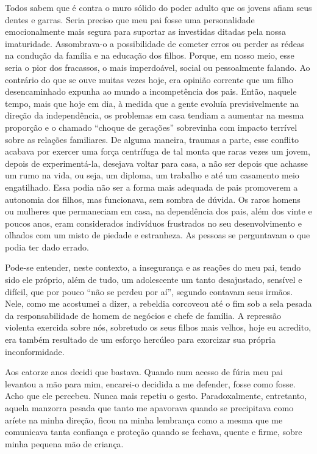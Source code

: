 Todos sabem que é contra o muro sólido do poder adulto que os jovens afiam seus dentes e garras. 
Seria preciso que meu pai fosse uma personalidade emocionalmente mais segura para suportar as investidas ditadas pela nossa imaturidade. 
Assombrava-o a possibilidade de cometer erros ou perder as rédeas na condução da família e na educação dos filhos. 
Porque, em nosso meio, esse seria o pior dos fracassos, o mais imperdoável, social ou pessoalmente falando. 
Ao contrário do que se ouve muitas vezes hoje, era opinião corrente que um filho desencaminhado expunha ao mundo a incompetência dos pais. 
Então, naquele tempo, mais que hoje em dia, à medida que a gente evoluía previsivelmente na direção da independência, os problemas em casa tendiam a aumentar na mesma proporção e o chamado “choque de gerações” sobrevinha com impacto terrível sobre as relações familiares. 
De alguma maneira, traumas a parte, esse conflito acabava por exercer uma força centrífuga de tal monta que raras vezes um jovem, depois de experimentá-la, desejava voltar para casa, a não ser depois que achasse um rumo na vida, ou seja, um diploma, um trabalho e até um casamento meio engatilhado. 
Essa podia não ser a forma mais adequada de pais promoverem a autonomia dos filhos, mas funcionava, sem sombra de dúvida. 
Os raros homens ou mulheres que permaneciam em casa, na dependência dos pais, além dos vinte e poucos anos, eram considerados indivíduos frustrados no seu desenvolvimento e olhados com um misto de piedade e estranheza.
As pessoas se perguntavam o que podia ter dado errado.  

Pode-se entender, neste contexto, a insegurança e as reações do meu pai, tendo sido ele próprio, além de tudo, um adolescente um tanto desajustado, sensível e difícil, que por pouco “não se perdeu por aí”, segundo contavam seus irmãos. 
Nele, como me acostumei a dizer, a rebeldia corcoveou até o fim sob a sela pesada da responsabilidade de homem de negócios e chefe de família. 
A repressão violenta exercida sobre nós, sobretudo os seus filhos mais velhos, hoje eu acredito, era também resultado de um esforço hercúleo para exorcizar sua própria inconformidade.

Aos catorze anos decidi que bastava. 
Quando num acesso de fúria meu pai levantou a mão para mim, encarei-o decidida a me defender, fosse como fosse. 
Acho que ele percebeu. Nunca mais repetiu o gesto. 
Paradoxalmente, entretanto, aquela manzorra pesada que tanto me apavorava quando se precipitava como aríete na minha direção, ficou na minha lembrança como a mesma que me comunicava tanta confiança e proteção quando se fechava, quente e firme, sobre minha pequena mão de criança.